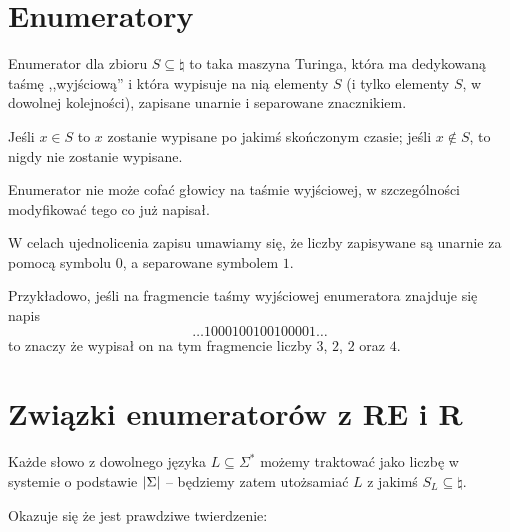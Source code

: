 \section{Enumeratory}

\begin{definition}
Enumerator dla zbioru \(S \subseteq \natural \) to taka maszyna Turinga, która ma dedykowaną taśmę ,,wyjściową'' i która wypisuje na nią elementy \(S\) (i tylko elementy \(S\), w dowolnej kolejności), zapisane unarnie i separowane znacznikiem. 

Jeśli \( x \in S \) to \( x \) zostanie wypisane po jakimś skończonym czasie; jeśli \(x \not \in S\), to nigdy nie zostanie wypisane. 

Enumerator nie może cofać głowicy na taśmie wyjściowej, w szczególności modyfikować tego co już napisał.

W celach ujednolicenia zapisu umawiamy się, że liczby zapisywane są unarnie za pomocą symbolu \(0\), a separowane symbolem \(1\). 

Przykładowo, jeśli na fragmencie taśmy wyjściowej enumeratora znajduje się napis
\[
    \dots 1000100100100001 \dots
\]
to znaczy że wypisał on na tym fragmencie liczby \(3\), \(2\), \(2\) oraz \(4\).
\end{definition}

\section{Związki enumeratorów z RE i R}

Każde słowo z dowolnego języka \( L \subseteq \Sigma^* \) możemy traktować jako liczbę w systemie o podstawie \( \card{\Sigma} \) -- będziemy zatem utożsamiać \( L \) z jakimś \( S_L \subseteq \natural \).

Okazuje się że jest prawdziwe twierdzenie:

